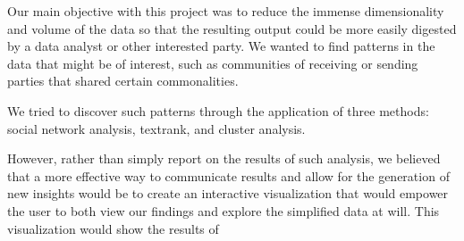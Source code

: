 Our main objective with this project was to reduce the immense dimensionality and volume of the data so that the resulting output could be more easily digested by a data analyst or other interested party. We wanted to find patterns in the data that might be of interest, such as communities of receiving or sending parties that shared certain commonalities. 

We tried to discover such patterns through the application of three methods: social network analysis, textrank, and cluster analysis.

However, rather than simply report on the results of such analysis, we believed that a more effective way to communicate results and allow for the generation of new insights would be to create an interactive visualization that would empower the user to both view our findings and explore the simplified data at will. This visualization would show the results of 
